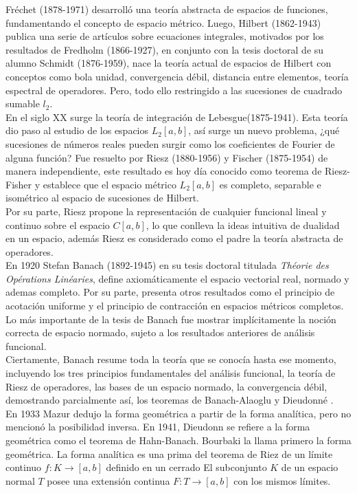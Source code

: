 \documentclass[10pt]{amsart}
\theoremstyle{remark}
\numberwithin{equation}{section}
\begin{document}
Fréchet (1878-1971) desarrolló una teoría abstracta de espacios de funciones, fundamentando el concepto de espacio métrico. Luego, Hilbert (1862-1943) publica una serie de artículos sobre ecuaciones integrales, motivados por los resultados de Fredholm (1866-1927), en conjunto con la tesis doctoral de su alumno Schmidt (1876-1959), nace la teoría actual de espacios de Hilbert con conceptos como bola unidad, convergencia débil, distancia entre elementos, teoría espectral de operadores. Pero, todo ello restringido a las sucesiones de cuadrado sumable $l_2 $.\\

En el siglo XX surge la teoría de integración de Lebesgue(1875-1941). Esta teoría dio paso al estudio de los espacios $L_2[a,b]$, así surge un nuevo problema, ¿qué sucesiones de números reales pueden surgir como los coeficientes de Fourier de alguna función? Fue resuelto por Riesz (1880-1956) y Fischer (1875-1954) de manera independiente, este resultado es hoy día conocido como teorema de Riesz-Fisher y establece que el espacio métrico $L_2[a,b]$ es completo, separable e isométrico al espacio de sucesiones de Hilbert.\\

Por su parte, Riesz propone la representación de cualquier funcional lineal y continuo sobre el espacio $ C[a,b]$, lo que conlleva la ideas intuitiva de dualidad en un espacio, además Riesz es considerado como el padre la teoría abstracta de operadores.\\

En 1920 Stefan Banach (1892-1945) en su tesis doctoral titulada \textit{Théorie des Opérations Linéaries}, define axiomáticamente el espacio vectorial real, normado y ademas completo. Por su parte, presenta otros resultados como el principio de acotación uniforme y el principio de contracción en espacios métricos completos. Lo más importante de la tesis de Banach fue mostrar implícitamente la noción correcta de espacio normado, sujeto a los resultados anteriores de análisis funcional.\\

Ciertamente, Banach resume toda la teoría que se conocía hasta ese momento, incluyendo los tres principios fundamentales del análisis funcional, la teoría de Riesz de operadores, las bases de un espacio normado, la convergencia débil, demostrando parcialmente así, los teoremas de Banach-Alaoglu y Dieudonné \cite{ArtAca03}.\\

En 1933 Mazur dedujo la forma geométrica a partir de la forma analítica, pero no mencionó la posibilidad inversa. En 1941, Dieudonn se refiere a la forma geométrica como el teorema de Hahn-Banach. Bourbaki la llama primero la forma geométrica. La forma analítica es una prima del teorema de Riez de un límite continuo $ f \colon K \rightarrow \left [a, b \right] $ definido en un cerrado El subconjunto $ K $ de un espacio normal $ T $ posee una extensión continua $ F \colon T \rightarrow \left [a, b \right] $ con los mismos límites.\\
\end{document}
